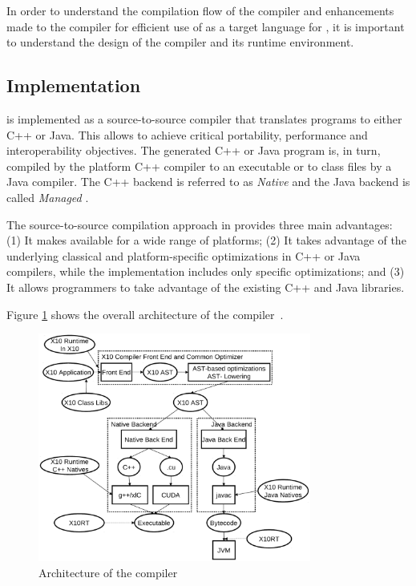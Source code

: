 In order to understand the compilation flow of the \mixten compiler and
enhancements made to the \xten compiler for efficient use of \xten as a target
language for \matlab, it is important to understand the design of the \xten
compiler and its runtime environment.  

\subsection{\xten Implementation}
\xten is implemented as a source-to-source compiler that translates \xten
programs to either C++ or Java. This allows \xten to achieve critical
portability, performance and interoperability objectives. The generated C++ or
Java program is, in turn, compiled by the platform C++ compiler to an executable
or to class files by a Java compiler. The C++ backend is referred to as
\emph{Native \xten} and the Java backend is called \emph{Managed \xten}. 

The
source-to-source compilation approach in \xten provides 
three main advantages: (1) It makes \xten
available for a wide range of platforms; (2) It takes advantage of the
underlying classical and platform-specific optimizations in C++ or Java
compilers, while the \xten implementation includes only \xten specific
optimizations; and (3) It allows programmers to take advantage of the existing
C++ and Java libraries.

Figure \ref{fig:x10compiler} shows the overall architecture of the \xten
compiler~\cite{x10intro}.  
 
\begin{figure}[htpb]
    \centering
    \includegraphics[width=0.8\textwidth]{Figures/x10compiler.eps}
    \caption{Architecture of the \xten compiler}
    \label{fig:x10compiler}
\end{figure}

